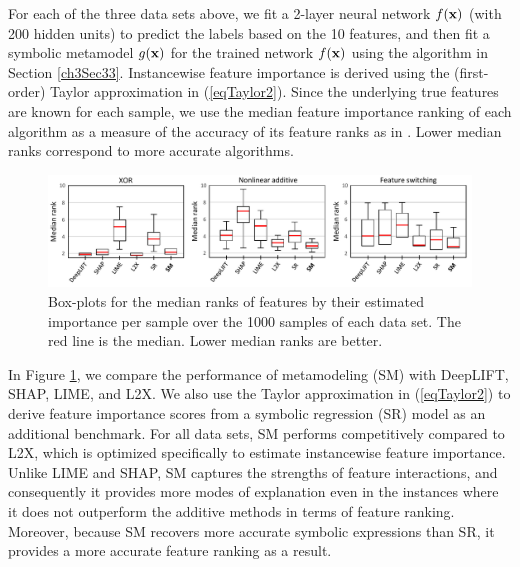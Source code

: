 \documentclass [PhD] {uclathes}
\begin{document}
For each of the three data sets above, we fit a 2-layer neural network $f({\bf x})$ (with 200 hidden units) to predict the labels based on the 10 features, and then fit a symbolic metamodel $g({\bf x})$ for the trained network $f({\bf x})$  using the algorithm in Section \ref{ch3Sec33}. Instancewise feature importance is derived using the (first-order) Taylor approximation in (\ref{eqTaylor2}). Since the underlying true features are known for each sample, we use the median feature importance ranking of each algorithm as a measure of the accuracy of its feature ranks as in \cite{chen2018learning}. Lower median ranks correspond to more accurate algorithms. 

\begin{figure}[t]
\centering
\includegraphics[width=6.5in]{ch3Fig4.pdf}
\caption{Box-plots for the median ranks of features by their estimated importance per sample over the 1000 samples of each data set. The red line is the median. Lower median ranks are better.}
\label{ch3fig4} 
\end{figure}

In Figure \ref{ch3fig4}, we compare the performance of metamodeling (SM) with DeepLIFT, SHAP, LIME, and L2X. We also use the Taylor approximation in (\ref{eqTaylor2}) to derive feature importance scores from a symbolic regression (SR) model as an additional benchmark. For all data sets, SM performs competitively compared to L2X, which is optimized specifically to estimate instancewise feature importance. Unlike LIME and SHAP, SM captures the strengths of feature interactions, and consequently it provides more modes of explanation even in the instances where it does not outperform the additive methods in terms of feature ranking. Moreover, because SM recovers more accurate symbolic expressions than SR, it provides a more accurate feature ranking as a result.
\end{document}

